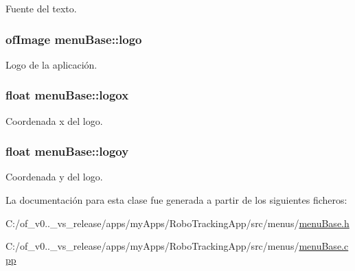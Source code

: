 Fuente del texto. 

\hypertarget{classmenu_base_a817536aa29cfe8f13d1e7c745e45b31d}{}
\subsubsection[{logo}]{\setlength{\rightskip}{0pt plus 5cm}of\+Image menu\+Base\+::logo\hspace{0.3cm}{\ttfamily [protected]}}\label{classmenu_base_a817536aa29cfe8f13d1e7c745e45b31d}


Logo de la aplicación. 

\hypertarget{classmenu_base_a97f2f1c174cadb12ae7b62f672fcde97}{}
\subsubsection[{logox}]{\setlength{\rightskip}{0pt plus 5cm}float menu\+Base\+::logox\hspace{0.3cm}{\ttfamily [protected]}}\label{classmenu_base_a97f2f1c174cadb12ae7b62f672fcde97}


Coordenada x del logo. 

\hypertarget{classmenu_base_a8bd56c156201d813c9c6da884cd98296}{}
\subsubsection[{logoy}]{\setlength{\rightskip}{0pt plus 5cm}float menu\+Base\+::logoy\hspace{0.3cm}{\ttfamily [protected]}}\label{classmenu_base_a8bd56c156201d813c9c6da884cd98296}


Coordenada y del logo. 



La documentación para esta clase fue generada a partir de los siguientes ficheros\+:\begin{DoxyCompactItemize}
\item 
C\+:/of\+\_\+v0..\+\_\+vs\+\_\+release/apps/my\+Apps/\+Robo\+Tracking\+App/src/menus/\hyperlink{menu_base_8h}{menu\+Base.\+h}\item 
C\+:/of\+\_\+v0..\+\_\+vs\+\_\+release/apps/my\+Apps/\+Robo\+Tracking\+App/src/menus/\hyperlink{menu_base_8cpp}{menu\+Base.\+cpp}\end{DoxyCompactItemize}
